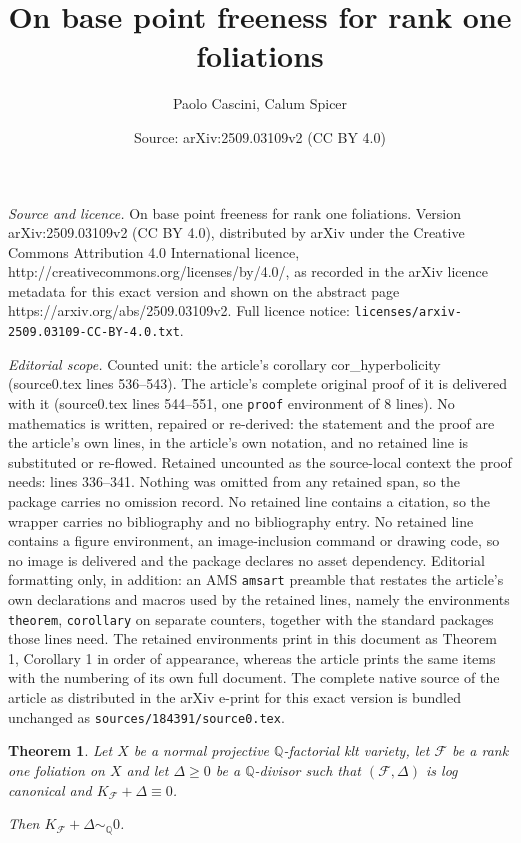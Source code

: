 \documentclass[10pt,a4paper]{amsart}
\title{On base point freeness for rank one foliations}
\author{Paolo Cascini, Calum Spicer}
\date{Source: arXiv:2509.03109v2 (CC BY 4.0)}
\newtheorem{theorem}{Theorem}
\begin{document}
\maketitle

\noindent\emph{Source and licence.} On base point freeness for rank one foliations. Version arXiv:2509.03109v2 (CC BY 4.0), distributed by arXiv under the Creative Commons Attribution 4.0 International licence, http://creativecommons.org/licenses/by/4.0/, as recorded in the arXiv licence metadata for this exact version and shown on the abstract page https://arxiv.org/abs/2509.03109v2. Full licence notice: \texttt{licenses/arxiv-2509.03109-CC-BY-4.0.txt}.\par\smallskip

\noindent\textit{Editorial scope.} Counted unit: the article's corollary cor\_hyperbolicity (source0.tex lines 536--543). The article's complete original proof of it is delivered with it (source0.tex lines 544--551, one \texttt{proof} environment of 8 lines). No mathematics is written, repaired or re-derived: the statement and the proof are the article's own lines, in the article's own notation, and no retained line is substituted or re-flowed.  Retained uncounted as the source-local context the proof needs: lines 336--341.  Nothing was omitted from any retained span, so the package carries no omission record.  No retained line contains a citation, so the wrapper carries no bibliography and no bibliography entry.  No retained line contains a figure environment, an image-inclusion command or drawing code, so no image is delivered and the package declares no asset dependency.  Editorial formatting only, in addition: an AMS \texttt{amsart} preamble that restates the article's own declarations and macros used by the retained lines, namely the environments \texttt{theorem}, \texttt{corollary} on separate counters, together with the standard packages those lines need.  The retained environments print in this document as Theorem 1, Corollary 1 in order of appearance, whereas the article prints the same items with the numbering of its own full document.  The complete native source of the article as distributed in the arXiv e-print for this exact version is bundled unchanged as \texttt{sources/184391/source0.tex}.
\begin{theorem}\label{t_main}
Let $X$ be a normal projective $\mathbb Q$-factorial klt variety, let $\mathcal F$ be a rank one foliation on $X$ and let $\Delta \ge 0$ be a $\mathbb Q$-divisor such that $(\mathcal F, \Delta)$ is log canonical and 
$K_{\mathcal F}+\Delta \equiv 0$.  

Then $K_{\mathcal F}+\Delta \sim_{\mathbb Q}0$.
\end{theorem}
\end{document}
